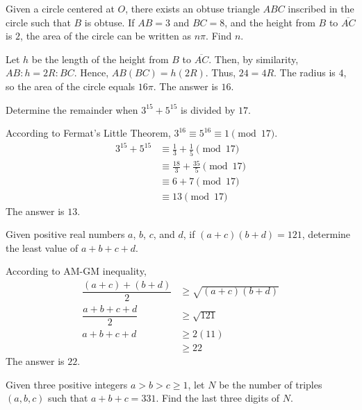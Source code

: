 \begin{problem}
Given a circle centered at $O$, there exists an obtuse triangle $ABC$ inscribed in the circle such that $B$ is obtuse. If $AB=3$ and $BC=8$, and the height from $B$ to $\overline{AC}$ is $2$, the area of the circle can be written as $n\pi$. Find $n$.
\end{problem}

\begin{solution}
Let $h$ be the length of the height from $B$ to $\overline{AC}$. Then, by similarity, $AB:h=2R:BC$. Hence, $AB(BC)=h(2R)$. Thus, $24=4R$. The radius is $4$, so the area of the circle equals $16\pi$. The answer is $16$.
\end{solution}

\begin{problem}
Determine the remainder when $3^{15}+5^{15}$ is divided by $17$. 
\end{problem}

\begin{solution}
According to Fermat's Little Theorem, $3^{16}\equiv 5^{16} \equiv 1 \pmod{17}$.
\begin{align*}
    3^{15}+5^{15} & \equiv \frac13+\frac15 \pmod{17}\\
    & \equiv \frac{18}{3}+\frac{35}{5} \pmod{17}\\
    & \equiv 6+7 \pmod{17}\\
    & \equiv 13 \pmod{17}
\end{align*}
The answer is $13$.
\end{solution}

\begin{problem}
Given positive real numbers $a$, $b$, $c$, and $d$, if $(a+c)(b+d)=121$, determine the least value of $a+b+c+d$.
\end{problem}

\begin{solution}
According to AM-GM inequality, 
\begin{align*}
    \dfrac{(a+c)+(b+d)}{2} & \geq \sqrt{(a+c)(b+d)}\\
    \dfrac{a+b+c+d}{2} & \geq \sqrt{121}\\
    a+b+c+d &\geq 2(11)\\
    &\geq 22
\end{align*}
The answer is $22$.
\end{solution}

\begin{problem}
Given three positive integers $a>b>c\geq1$, let $N$ be the number of triples $(a,b,c)$ such that $a+b+c=331$. Find the last three digits of $N$.
\end{problem}

